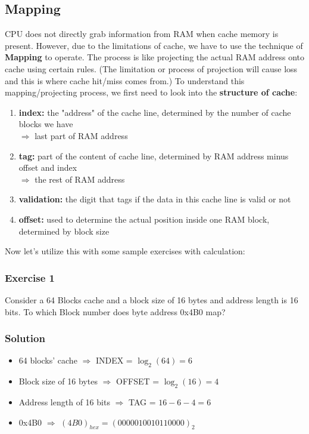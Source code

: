 \documentclass{article}
\begin{document}
\subsection{Mapping}
CPU does not directly grab information from RAM when cache memory is present. However, due to the limitations of cache, we have to use the technique of \textbf{Mapping} to operate. The process is like projecting the actual RAM address onto cache using certain rules. (The limitation or process of projection will cause loss and this is where cache hit/miss comes from.) To understand this mapping/projecting process, we first need to look into the \textbf{structure of cache}:
\begin{enumerate}
    \item \textbf{index:}  the "address" of the cache line, determined by the number of cache blocks we have\\  $\Rightarrow$ last part of RAM address
    \item \textbf{tag:} part of the content of cache line, determined by RAM address minus offset and index\\   $\Rightarrow$ the rest of RAM address
    \item \textbf{validation:}  the digit that tags if the data in this cache line is valid or not
    \item \textbf{offset:} used to determine the actual position inside one RAM block, determined by block size
\end{enumerate}
Now let's utilize this with some sample exercises with calculation:
\subsubsection*{Exercise 1}
Consider a 64 Blocks cache and a block size of 16 bytes and address length is 16 bits. To which Block number does byte address 0x4B0 map?

\subsubsection*{Solution}
\begin{itemize}
    \item 64 blocks' cache $\Rightarrow$ INDEX = $\log_2(64)=6$
    \item Block size of 16 bytes $\Rightarrow$ OFFSET = $\log_2(16)=4$
    \item Address length of 16 bits $\Rightarrow$ TAG = $16-6-4=6$
    \item 0x4B0 $\Rightarrow$ $(4B0)_{hex} = (0000010010110000)_2$
\end{itemize}
\end{document}
